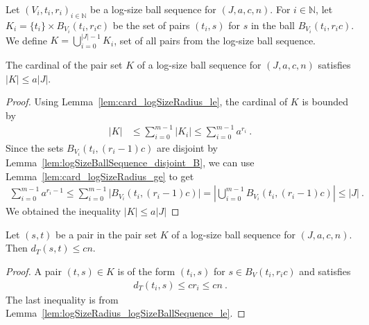\begin{definition}\label{def:pairSet}
  \leanok
Let $(V_i, t_i, r_i)_{i \in \mathbb{N}}$ be a log-size ball sequence for $(J, a, c, n)$.
For $i \in \mathbb{N}$, let $K_i = \{t_i\} \times B_{V_i}(t_i, r_i c)$ be the set of pairs $(t_i, s)$ for $s$ in the ball $B_{V_i}(t_i, r_i c)$.
We define $K = \bigcup_{i=0}^{\vert J \vert-1} K_i$, set of all pairs from the log-size ball sequence.
\end{definition}


\begin{lemma}\label{lem:card_pairSet_le}
  \leanok
The cardinal of the pair set $K$ of a log-size ball sequence for $(J, a, c, n)$ satisfies $|K| \le a |J|$.
\end{lemma}

\begin{proof}
Using Lemma~\ref{lem:card_logSizeRadius_le}, the cardinal of $K$ is bounded by
\begin{align*}
  \vert K \vert
  &\le \sum_{i=0}^{m-1} \vert K_i \vert
  \le \sum_{i=0}^{m-1} a^{r_i}
  \: .
\end{align*}
Since the sets $B_{V_i}(t_i, (r_i-1)c)$ are disjoint by Lemma~\ref{lem:logSizeBallSequence_disjoint_B}, we can use Lemma~\ref{lem:card_logSizeRadius_ge} to get
\begin{align*}
  \sum_{i=0}^{m-1} a^{r_i - 1}
  \le \sum_{i=0}^{m-1} \vert B_{V_i}(t_i, (r_i-1)c) \vert
  = \left\vert \bigcup_{i=0}^{m-1} B_{V_i}(t_i, (r_i-1)c) \right\vert
  \le \vert J \vert
  \: .
\end{align*}
We obtained the inequality $\vert K \vert \le a \vert J \vert$
\end{proof}


\begin{lemma}\label{lem:dist_le_of_mem_pairSet}
  \leanok
Let $(s, t)$ be a pair in the pair set $K$ of a log-size ball sequence for $(J, a, c, n)$.
Then $d_T(s, t) \le c n$.
\end{lemma}

\begin{proof}
A pair $(t, s) \in K$ is of the form $(t_i, s)$ for $s \in B_V(t_i, r_i c)$ and satisfies
\begin{align*}
  d_T(t_i, s) \le c r_i \le c n \: .
\end{align*}
The last inequality is from Lemma~\ref{lem:logSizeRadius_logSizeBallSequence_le}.
\end{proof}


